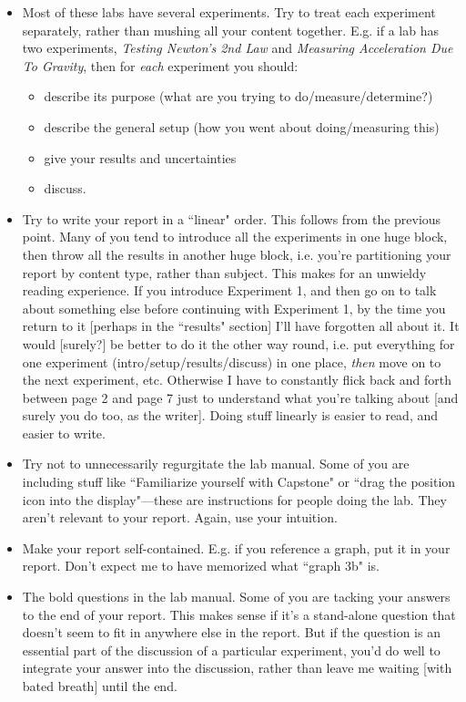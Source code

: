 \documentclass[11pt]{extarticle}
\begin{document}
\begin{itemize}
	\item Most of these labs have several experiments. Try to treat each experiment separately, rather than mushing all your content together. E.g. if a lab has two experiments, \textit{Testing Newton's 2nd Law} and \textit{Measuring Acceleration Due To Gravity}, then for \textit{each} experiment you should:
	\begin{itemize}
		\item describe its purpose (what are you trying to do/measure/determine?)
		\item describe the general setup (how you went about doing/measuring this)
		\item give your results and uncertainties 
		\item discuss. 
	\end{itemize}

	\item Try to write your report in a ``linear" order. This follows from the previous point. Many of you tend to introduce all the experiments in one huge block, then throw all the results in another huge block, i.e. you're partitioning your report by content type, rather than subject. This makes for an unwieldy reading experience. If you introduce Experiment 1, and then go on to talk about something else before continuing with Experiment 1, by the time you return to it [perhaps in the ``results" section] I'll have forgotten all about it. It would [surely?] be better to do it the other way round, i.e. put everything for one experiment (intro/setup/results/discuss) in one place, \textit{then} move on to the next experiment, etc. Otherwise I have to constantly flick back and forth between page 2 and page 7 just to understand what you're talking about [and surely you do too, as the writer]. Doing stuff linearly is easier to read, and easier to write.  

	\item Try not to unnecessarily regurgitate the lab manual. Some of you are including stuff like ``Familiarize yourself with Capstone" or ``drag the position icon into the display"---these are instructions for people doing the lab. They aren't relevant to your report. Again, use your intuition. 

	\item Make your report self-contained. E.g. if you reference a graph, put it in your report. Don't expect me to have memorized what ``graph 3b" is. 

	\item The bold questions in the lab manual. Some of you are tacking your answers to the end of your report. This makes sense if it's a stand-alone question that doesn't seem to fit in anywhere else in the report. But if the question is an essential part of the discussion of a particular experiment, you'd do well to integrate your answer into the discussion, rather than leave me waiting [with bated breath] until the end.  
\end{itemize} 
\end{document}
